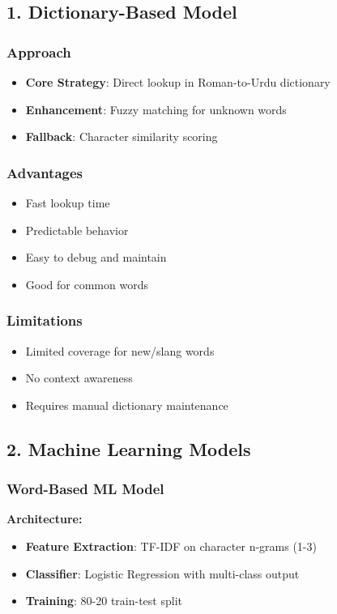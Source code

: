 \documentclass[10pt,twocolumn]{article}
\begin{document}
\subsection{1. Dictionary-Based Model}
\subsubsection*{Approach}
\begin{itemize}[leftmargin=*,noitemsep,topsep=0pt,parsep=0pt,partopsep=0pt]
    \item \textbf{Core Strategy}: Direct lookup in Roman-to-Urdu dictionary
    \item \textbf{Enhancement}: Fuzzy matching for unknown words
    \item \textbf{Fallback}: Character similarity scoring
\end{itemize}

\subsubsection*{Advantages}
\begin{itemize}[leftmargin=*,noitemsep,topsep=0pt,parsep=0pt,partopsep=0pt]
    \item Fast lookup time
    \item Predictable behavior
    \item Easy to debug and maintain
    \item Good for common words
\end{itemize}

\subsubsection*{Limitations}
\begin{itemize}[leftmargin=*,noitemsep,topsep=0pt,parsep=0pt,partopsep=0pt]
    \item Limited coverage for new/slang words
    \item No context awareness
    \item Requires manual dictionary maintenance
\end{itemize}

\subsection{2. Machine Learning Models}
\subsubsection*{Word-Based ML Model}
\textbf{Architecture:}
\begin{itemize}[leftmargin=*,noitemsep,topsep=0pt,parsep=0pt,partopsep=0pt]
    \item \textbf{Feature Extraction}: TF-IDF on character n-grams (1-3)
    \item \textbf{Classifier}: Logistic Regression with multi-class output
    \item \textbf{Training}: 80-20 train-test split
\end{itemize}
\end{document}
